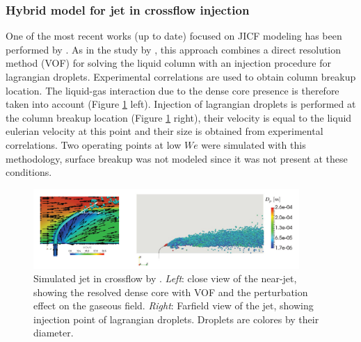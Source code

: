 \subsubsection*{Hybrid model for jet in crossflow injection }

One of the most recent works (up to date) focused on JICF modeling has been performed by . As in the study by , this approach combines a direct resolution method (VOF) for solving the liquid column with an injection procedure for lagrangian droplets. Experimental correlations are used to obtain column breakup location. The liquid-gas interaction due to the dense core presence is therefore taken into account (Figure \ref{fig:fontes_2019_lagrangian_fields} left). Injection of lagrangian droplets is performed at the column breakup location (Figure \ref{fig:fontes_2019_lagrangian_fields} right), their velocity is equal to the liquid eulerian velocity at this point and their size is obtained from experimental correlations. Two operating points at low $We$ were simulated with this methodology, surface breakup was not modeled since it was not present at these conditions. 

\begin{figure}[ht]
    \centering
    \includegraphics[width=0.9\textwidth]{./part1_numerical_approaches/figures_ch3/fontes_2019_lagrangian_fields}
       \centering
    \caption{Simulated jet in crossflow by . \textsl{Left}: close view of the near-jet, showing the resolved dense core with VOF and the perturbation effect on the gaseous field. \textsl{Right}: Farfield view of the jet, showing injection point of lagrangian droplets. Droplets are colores by their diameter. }
    \label{fig:fontes_2019_lagrangian_fields}
\end{figure}

 